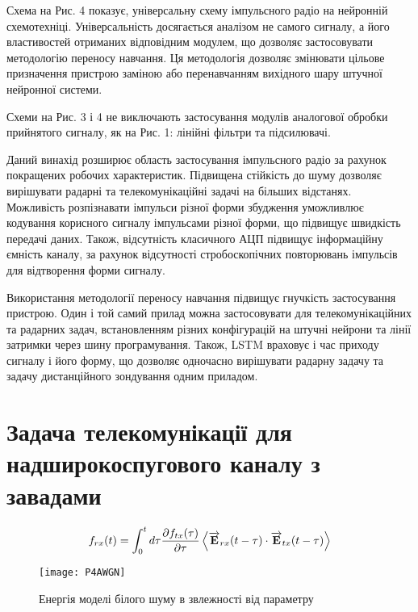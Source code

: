Схема на Рис. 4 показує, універсальну схему імпульсного радіо на 
нейронній схемотехніці. Універсальність досягається аналізом не самого 
сигналу, а його властивостей отриманих відповідним модулем, що дозволяє 
застосовувати методологію переносу навчання. Ця методологія дозволяє 
змінювати цільове призначення пристрою заміною або перенавчанням 
вихідного шару штучної нейронної системи.

Схеми на Рис. 3 і 4 не виключають застосування модулів аналогової 
обробки прийнятого сигналу, як на Рис. 1: лінійні фільтри 
та підсилювачі.

Даний винахід розширює область застосування імпульсного радіо за 
рахунок покращених робочих характеристик. Підвищена стійкість до 
шуму дозволяє вирішувати радарні та телекомунікаційні задачі на 
більших відстанях. Можливість розпізнавати імпульси різної форми 
збудження уможливлює кодування корисного сигналу імпульсами різної форми, 
що підвищує швидкість передачі даних. Також, відсутність класичного АЦП 
підвищує інформаційну ємність каналу, за рахунок відсутності 
стробоскопічних повторювань імпульсів для відтворення форми сигналу.

Використання методології переносу навчання підвищує гнучкість 
застосування пристрою. Один і той самий прилад можна застосовувати для 
телекомунікаційних та радарних задач, встановленням різних 
конфігурацій на штучні нейрони та лінії затримки через шину 
програмування. Також, LSTM враховує і час приходу сигналу і його форму, 
що дозволяє одночасно вирішувати радарну задачу та задачу дистанційного 
зондування одним приладом.


\section{Задача телекомунікації для надширокоспугового каналу з завадами}

\begin{equation}
f_{rx} (t) = \int_0^{t} d \tau \frac{\partial f_{tx}(\tau)}{\partial \tau} 
\left< \overrightarrow{\mathbf E}_{rx}(t - \tau) \cdot \overrightarrow{\mathbf E}_{tx} (t - \tau) \right>
\end{equation}

\begin{figure}[htbp] \begin{center}
\texttt{[image: P4AWGN]}
\caption{Енергія моделі білого шуму в звлежності від параметру} \label{fig:P4AWGN}
\end{center} \end{figure}

